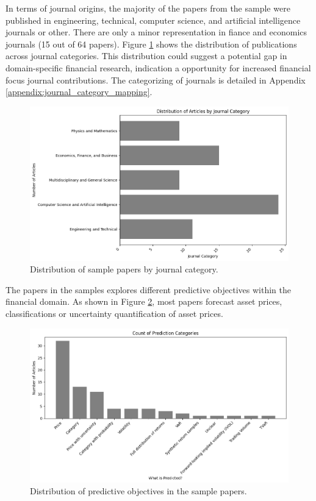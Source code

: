 In terms of journal origins, the majority of the papers from the sample were published in engineering, technical, computer science, and artificial intelligence journals or other. There are only a minor representation in fiance and economics journals (15 out of 64 papers). Figure \ref{fig:num_papers_per_journal_category} shows the distribution of publications across journal categories. This distribution could suggest a potential gap in domain-specific financial research, indication a opportunity for increased financial focus journal contributions. The categorizing of journals is detailed in Appendix \ref{appendix:journal_category_mapping}. 

\begin{figure}[H]
    \centering
    \includegraphics[width=1\linewidth]{Images/num_papers_per_journal_category.png}
    \caption{Distribution of sample papers by journal category.}
    \label{fig:num_papers_per_journal_category}
\end{figure}
The papers in the samples explores different predictive objectives within the financial domain. As shown in Figure \ref{fig:what_is_predicted}, most papers forecast asset prices, classifications or uncertainty quantification of asset prices. 
\begin{figure}[H]
    \centering
    \includegraphics[width=1\linewidth]{Images/what_is_predicted.png}
    \caption{Distribution of predictive objectives in the sample papers.}
    \label{fig:what_is_predicted}
\end{figure}
